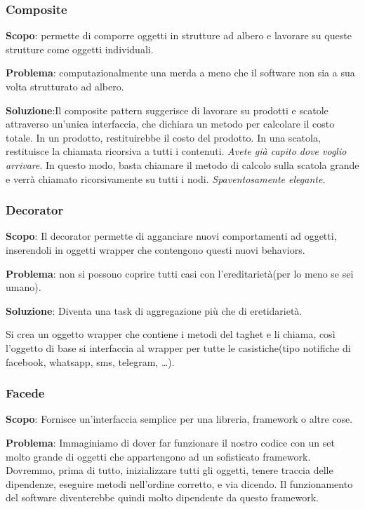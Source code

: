 \documentclass{article}
\begin{document}
\subsubsection{Composite}
\textbf{Scopo}: permette di comporre oggetti in strutture ad albero e lavorare su 
queste strutture come oggetti individuali.

\textbf{Problema}: computazionalmente una merda a meno che il software non sia a sua volta strutturato ad albero.

\textbf{Soluzione}:Il composite pattern suggerisce di lavorare su prodotti e scatole attraverso un'unica interfaccia,
che dichiara un metodo per calcolare il costo totale. In un prodotto, restituirebbe il costo del prodotto. In
una scatola, restituisce la chiamata ricorsiva a tutti i contenuti. \textit{Avete già capito dove voglio arrivare}. In
questo modo, basta chiamare il metodo di calcolo sulla scatola grande e verrà chiamato ricorsivamente su
tutti i nodi. \textit{Spaventosamente elegante.}

\subsubsection{Decorator}
\textbf{Scopo}: Il decorator permette di agganciare nuovi comportamenti ad oggetti, inserendoli in oggetti wrapper
che contengono questi nuovi behaviors.


\textbf{Problema}: non si possono coprire tutti casi con l'ereditarietà(per lo meno se sei umano).

\textbf{Soluzione}: Diventa una task di aggregazione più che di eretidarietà.

Si crea un oggetto wrapper che contiene i metodi del taghet e li chiama, così l'oggetto
 di base si interfaccia al wrapper per tutte le casistiche(tipo notifiche di facebook, whatsapp, sms, telegram, \dots).


\subsubsection{Facede}
\textbf{Scopo}: Fornisce un'interfaccia semplice per una libreria, framework o altre cose.

\textbf{Problema}: Immaginiamo di dover far funzionare il nostro codice con un set molto grande di oggetti che
appartengono ad un sofisticato framework. Dovremmo, prima di tutto, inizializzare tutti gli oggetti, tenere
traccia delle dipendenze, eseguire metodi nell'ordine corretto, e via dicendo. Il funzionamento del software
diventerebbe quindi molto dipendente da questo framework.
\end{document}
